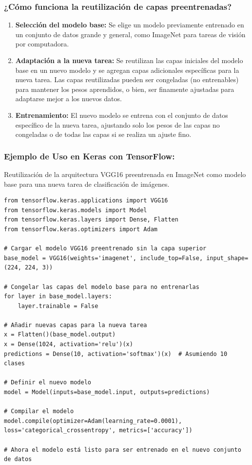 \documentclass[11pt]{article}
\begin{document}
\subsubsection{¿Cómo funciona la reutilización de capas preentrenadas?}
\label{sec:org3e037a9}
\begin{enumerate}
\item \textbf{Selección del modelo base:} Se elige un modelo previamente entrenado
en un conjunto de datos grande y general, como ImageNet para tareas
de visión por computadora.
\item \textbf{Adaptación a la nueva tarea:} Se reutilizan las capas iniciales del
modelo base en un nuevo modelo y se agregan capas adicionales
específicas para la nueva tarea. Las capas reutilizadas pueden ser
congeladas (no entrenables) para mantener los pesos aprendidos, o
bien, ser finamente ajustadas para adaptarse mejor a los nuevos
datos.
\item \textbf{Entrenamiento:} El nuevo modelo se entrena con el conjunto de datos
específico de la nueva tarea, ajustando solo los pesos de las capas
no congeladas o de todas las capas si se realiza un ajuste fino.
\end{enumerate}

\subsubsection{Ejemplo de Uso en Keras con TensorFlow:}
\label{sec:org488f09c}
Reutilización de la arquitectura VGG16 preentrenada en ImageNet como
modelo base para una nueva tarea de clasificación de imágenes.

\begin{verbatim}
from tensorflow.keras.applications import VGG16
from tensorflow.keras.models import Model
from tensorflow.keras.layers import Dense, Flatten
from tensorflow.keras.optimizers import Adam

# Cargar el modelo VGG16 preentrenado sin la capa superior
base_model = VGG16(weights='imagenet', include_top=False, input_shape=(224, 224, 3))

# Congelar las capas del modelo base para no entrenarlas
for layer in base_model.layers:
    layer.trainable = False

# Añadir nuevas capas para la nueva tarea
x = Flatten()(base_model.output)
x = Dense(1024, activation='relu')(x)
predictions = Dense(10, activation='softmax')(x)  # Asumiendo 10 clases

# Definir el nuevo modelo
model = Model(inputs=base_model.input, outputs=predictions)

# Compilar el modelo
model.compile(optimizer=Adam(learning_rate=0.0001), loss='categorical_crossentropy', metrics=['accuracy'])

# Ahora el modelo está listo para ser entrenado en el nuevo conjunto de datos
\end{verbatim}
\end{document}
